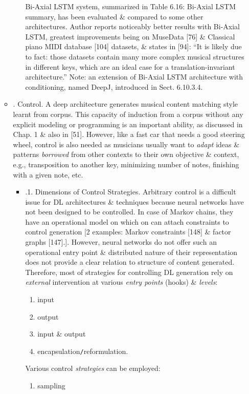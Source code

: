 \documentclass{article}
\begin{document}
\begin{itemize}
\begin{itemize}
\begin{itemize}
			Bi-Axial LSTM system, summarized in {\sf Table 6.16: Bi-Axial LSTM summary}, has been evaluated \& compared to some other architectures. Author reports noticeably better results with Bi-Axial LSTM, greatest improvements being on MuseData [76] \& Classical piano MIDI database [104] datasets, \& states in [94]: ``It is likely due to fact: those datasets contain many more complex musical structures in different keys, which are an ideal case for a translation-invariant architecture.'' Note: an extension of Bi-Axial LSTM architecture with conditioning, named DeepJ, introduced in Sect. 6.10.3.4.
		\end{itemize}
		\item {. Control.} A deep architecture generates musical content matching style learnt from corpus. This capacity of induction from a corpus without any explicit modeling or programming is an important ability, as discussed in Chap. 1 \& also in [51]. However, like a fast car that needs a good steering wheel, control is also needed as musicians usually want to {\it adapt} ideas \& patterns {\it borrowed} from other contexts to their own objective \& context, e.g., transposition to another key, minimizing number of notes, finishing with a given note, etc.
		\begin{itemize}
			\item {.1. Dimensions of Control Strategies.} Arbitrary control is a difficult issue for DL architectures \& techniques because neural networks have not been designed to be controlled. In case of Markov chains, they have an operational model on which on can attach constraints to control generation [2 examples: Markov constraints [148] \& factor graphs [147].]. However, neural networks do not offer such an operational entry point \& distributed nature of their representation does not provide a clear relation to structure of content generated. Therefore, most of strategies for controlling DL generation rely on {\it external} intervention at various {\it entry points} (hooks) \& {\it levels}:
			\begin{enumerate}
				\item input
				\item output
				\item input \& output
				\item encapsulation{\tt/}reformulation.
			\end{enumerate}
			Various control {\it strategies} can be employed:
			\begin{enumerate}
				\item sampling

\end{enumerate}
\end{itemize}
\end{itemize}
\end{itemize}
\end{document}
